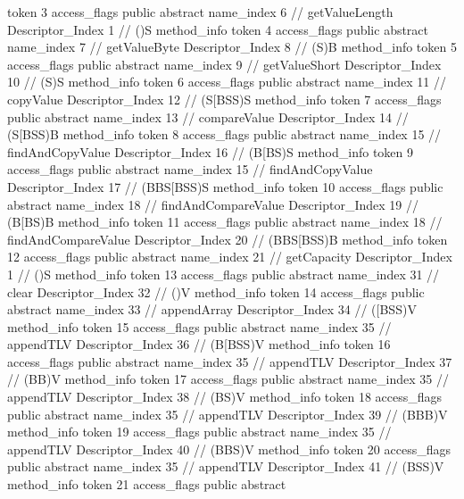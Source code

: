 {{{{{					token	3
					access_flags	public abstract
					name_index	6		// getValueLength
					Descriptor_Index	1		// ()S
				}
				method_info {
					token	4
					access_flags	public abstract
					name_index	7		// getValueByte
					Descriptor_Index	8		// (S)B
				}
				method_info {
					token	5
					access_flags	public abstract
					name_index	9		// getValueShort
					Descriptor_Index	10		// (S)S
				}
				method_info {
					token	6
					access_flags	public abstract
					name_index	11		// copyValue
					Descriptor_Index	12		// (S[BSS)S
				}
				method_info {
					token	7
					access_flags	public abstract
					name_index	13		// compareValue
					Descriptor_Index	14		// (S[BSS)B
				}
				method_info {
					token	8
					access_flags	public abstract
					name_index	15		// findAndCopyValue
					Descriptor_Index	16		// (B[BS)S
				}
				method_info {
					token	9
					access_flags	public abstract
					name_index	15		// findAndCopyValue
					Descriptor_Index	17		// (BBS[BSS)S
				}
				method_info {
					token	10
					access_flags	public abstract
					name_index	18		// findAndCompareValue
					Descriptor_Index	19		// (B[BS)B
				}
				method_info {
					token	11
					access_flags	public abstract
					name_index	18		// findAndCompareValue
					Descriptor_Index	20		// (BBS[BSS)B
				}
				method_info {
					token	12
					access_flags	public abstract
					name_index	21		// getCapacity
					Descriptor_Index	1		// ()S
				}
				method_info {
					token	13
					access_flags	public abstract
					name_index	31		// clear
					Descriptor_Index	32		// ()V
				}
				method_info {
					token	14
					access_flags	public abstract
					name_index	33		// appendArray
					Descriptor_Index	34		// ([BSS)V
				}
				method_info {
					token	15
					access_flags	public abstract
					name_index	35		// appendTLV
					Descriptor_Index	36		// (B[BSS)V
				}
				method_info {
					token	16
					access_flags	public abstract
					name_index	35		// appendTLV
					Descriptor_Index	37		// (BB)V
				}
				method_info {
					token	17
					access_flags	public abstract
					name_index	35		// appendTLV
					Descriptor_Index	38		// (BS)V
				}
				method_info {
					token	18
					access_flags	public abstract
					name_index	35		// appendTLV
					Descriptor_Index	39		// (BBB)V
				}
				method_info {
					token	19
					access_flags	public abstract
					name_index	35		// appendTLV
					Descriptor_Index	40		// (BBS)V
				}
				method_info {
					token	20
					access_flags	public abstract
					name_index	35		// appendTLV
					Descriptor_Index	41		// (BSS)V
				}
				method_info {
					token	21
					access_flags	public abstract
}}}}}
